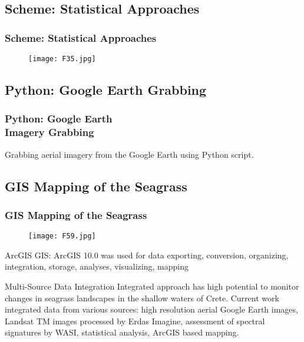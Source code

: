 \documentclass[pdflatex,compress,9pt,
	xcolor={dvipsnames,dvipsnames,svgnames,x11names,table},
	hyperref={colorlinks = true,breaklinks = true, urlcolor = NavyBlue, breaklinks = true}]{beamer}
\begin{document}
\subsection{Scheme: Statistical Approaches}
\begin{frame}\frametitle{Scheme: Statistical Approaches}
\begin{figure}[H]
	\centering
		\texttt{[image: F35.jpg]}
\end{figure}
\end{frame}

\subsection{Python: Google Earth Grabbing}
\begin{frame}\frametitle{Python: Google Earth \\Imagery Grabbing}
Grabbing aerial imagery from the Google Earth using Python script.
\begin{figure}[H]
	\centering
			\hspace{1mm}
\end{figure}
\end{frame}

\subsection{GIS Mapping of the Seagrass}
\begin{frame}\frametitle{GIS Mapping of the Seagrass}
\begin{figure}[H]
	\centering
		\texttt{[image: F59.jpg]}
\end{figure}
\begin{alertblock}{ArcGIS}
\ac{GIS}: ArcGIS 10.0 was used for data exporting, conversion, organizing, integration, storage, analyses, visualizing, mapping
\end{alertblock}

\begin{block}{Multi-Source Data Integration}
Integrated approach has high potential to monitor changes in seagrass landscapes in the shallow waters of Crete. Current work integrated data from various sources: high resolution aerial Google Earth images, \ac{Landsat TM} images processed by Erdas Imagine, assessment of spectral signatures by \ac{WASI}, statistical analysis, ArcGIS based mapping.
\end{block}

\end{frame}
\end{document}
